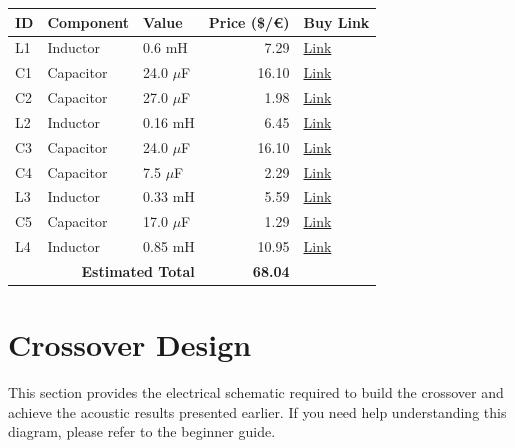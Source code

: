 \documentclass[11pt,a4paper]{report}
\begin{document}
\vspace{0.5cm}
\begin{table}[H]
    \centering
    \renewcommand{\arraystretch}{1.5}
    \begin{tabular}{@{}lllrl@{}}
        \toprule
        \textbf{ID} & \textbf{Component} & \textbf{Value} & \textbf{Price (\$/€)} & \textbf{Buy Link} \\
        \midrule
        L1 & Inductor & 0.6 mH & 7.29 & \href{https://www.parts-express.com/Jantzen-1951-0.60mH-18-AWG-Air-Core-Inductor-255-234}{Link} \\
        C1 & Capacitor & 24.0 $\mu$F & 16.10 & \href{https://www.parts-express.com/Solen-24uF-400V-Polypropylene-Capacitor-027-586}{Link} \\
        C2 & Capacitor & 27.0 $\mu$F & 1.98 & \href{https://www.soundimports.eu/en/jantzen-audio-001-6150.html}{Link} \\
        L2 & Inductor & 0.16 mH & 6.45 & \href{https://www.soundimports.eu/en/jantzen-audio-000-1627.html}{Link} \\
        C3 & Capacitor & 24.0 $\mu$F & 16.10 & \href{https://www.parts-express.com/Solen-24uF-400V-Polypropylene-Capacitor-027-586}{Link} \\
        C4 & Capacitor & 7.5 $\mu$F & 2.29 & \href{https://www.parts-express.com/Solen-7.5uF-400V-Polypropylene-Capacitor-027-562}{Link} \\
        L3 & Inductor & 0.33 mH & 5.59 & \href{https://www.parts-express.com/Dayton-Audio-LW18-33-0.33mH-18-AWG-Perfect-Layer-Inductor-257-812}{Link} \\
        C5 & Capacitor & 17.0 $\mu$F & 1.29 & \href{https://www.parts-express.com/17uF-100V-Non-Polarized-Capacitor-027-346}{Link} \\
        L4 & Inductor & 0.85 mH & 10.95 & \href{https://www.soundimports.eu/en/jantzen-audio-000-1284.html}{Link} \\
        \midrule
        \multicolumn{3}{r}{\textbf{Estimated Total}} & \textbf{68.04} & \\
        \bottomrule
    \end{tabular}
\end{table}


\chapter{Crossover Design}
This section provides the electrical schematic required to build the crossover and achieve the acoustic results presented earlier. If you need help understanding this diagram, please refer to the beginner guide.
\end{document}
